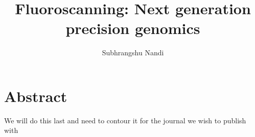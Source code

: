 \documentclass[11pt]{extarticle} %
\begin{document}

\title{Fluoroscanning: Next generation precision genomics}
\author{Subhrangshu Nandi \\
\date{}
}

\maketitle


\section*{Abstract}
We will do this last and need to contour it for the journal we wish to publish with
\end{document}
